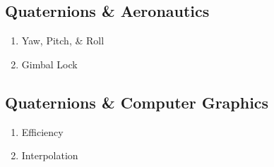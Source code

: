 \subsection{Quaternions \& Aeronautics}
	\begin{enumerate}[label={(\alph*)}]
		\item Yaw, Pitch, \& Roll
		\item Gimbal Lock
	\end{enumerate}

\subsection{Quaternions \& Computer Graphics}
	\begin{enumerate}[label={(\alph*)}]
		\item Efficiency
		\item Interpolation
	\end{enumerate}
